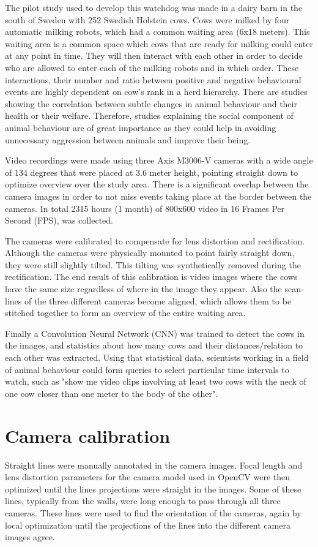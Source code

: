 \documentclass[10pt,a4paper,twocolumn]{article}
\begin{document}
The pilot study used to develop this watchdog was made in a dairy barn in the south of Sweden with 252 Swedish Holstein cows. Cows were milked by four automatic milking robots, which had a common waiting area (6x18 meters). This waiting area is a common space which cows that are ready for milking could enter at any point in time. They will then interact with each other  in order to decide who are allowed to enter each of the milking robots and in which order. These interactions, their number and ratio between positive and negative behavioural events are highly dependent on cow's rank in a herd hierarchy. There are studies showing the correlation between subtle changes in animal behaviour and their health or their welfare. Therefore, studies explaining the social component of animal behaviour are of great importance as they could help in avoiding unnecessary aggression between animals and improve their being.

Video recordings were made using three Axis M3006-V cameras with a wide angle of 134 degrees that were placed at 3.6 meter height, pointing straight down to optimize overview over the study area. There is a significant overlap between the camera images in order to not miss events taking place at the border between the cameras. In total 2315 hours (1 month) of 800x600 video in 16 Frames Per Second (FPS), was collected.

The cameras were calibrated to compensate for lens distortion and rectification. Although the cameras were physically mounted to point fairly straight down, they were still slightly tilted. This tilting was synthetically removed during the rectification. The end result of this calibration is video images where the cows have the same size regardless of where in the image they appear. Also the scan-lines of the three different cameras become aligned, which allows them to be stitched together to form an overview of the entire waiting area.

Finally a Convolution Neural Network (CNN)  was trained to detect the cows in the images, and statistics about how many cows and their distances/relation to each other was extracted. Using that statistical data, scientists working in a field of animal behaviour could form queries to select particular time intervals to watch, such as "show me video clips involving at least two cows with the neck of one cow closer than one meter to the body of the other".

\section{Camera calibration}
Straight lines were manually annotated in the camera images. Focal length and lens distortion parameters for the camera model used in OpenCV were then  optimized until the lines projections were straight in the images. Some of these lines, typically from the walls, were long enough to pass through all three cameras. These lines were used to find the orientation of the cameras, again by local optimization until the projections of the lines into the different camera images agree.
\end{document}
